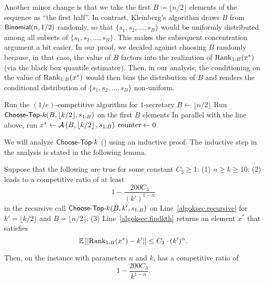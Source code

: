 Another minor change is that we take the first $B \coloneqq \lfloor n/2\rfloor$ elements of the sequence as ``the first half''. In contrast, Kleinberg's algorithm draws $B$ from $\mathsf{Binomial}(n, 1/2)$ randomly, so that $\{s_1, s_2, \ldots, s_B\}$ would be uniformly distributed among all subsets of $\{s_1, s_2, \ldots, s_B\}$. This makes the subsequent concentration argument a bit easier. In our proof, we decided against choosing $B$ randomly because, in that case, the value of $B$ factors into the realization of $\mathrm{Rank}_{1:B}(x^*)$ (via the black box quantile estimator). Then, in our analysis, the conditioning on the value of $\mathrm{Rank}_{1:B}(x^*)$ would then bias the distribution of $B$ and renders the conditional distribution of $\{s_1, s_2, \ldots, s_B\}$ non-uniform.

\begin{algorithm2e}
    \caption{$\choosetopk(n, k, s)$}
    \label{algo:k-secretary}
    {Run the $(1/e)$-competitive algorithm for $1$-secretary}
    $B \leftarrow \lfloor n/2\rfloor$\;
    Run $\textsf{Choose-Top-}k(B, \lfloor k/2\rfloor, s_{1:B})$ on the first $B$ elements\label{algoksec.recursive}\;
    In parallel with the line above, run $x^* \leftarrow \mathcal{A}\left(B, \left\lfloor k/2\right\rfloor, s_{1:B}\right)$\label{algoksec.findkth}\;
    $\mathrm{counter} \gets 0$\;
\end{algorithm2e}

We will analyze $\textsf{Choose-Top-}k$ () using an inductive proof. The inductive step in the analysis is stated in the following lemma.

\begin{lemma}\label{lemma:k-secretary-inductive}
    Suppose that the following are true for some constant $C_3 \ge 1$: (1) $n \ge k \ge 10$; (2)  leads to a competitive ratio of at least 
    \[
        1 - \frac{200C_3}{(k')^{1 - \alpha}}
    \]
    in the recursive call $\textsf{Choose-Top-}k(B, k', s_{1:B})$ on Line~\ref{algoksec.recursive} for $k' = \lfloor k/2 \rfloor$ and $B = \lfloor n/2 \rfloor$; (3) Line~\ref{algoksec.findkth} returns an element $x^*$ that satisfies 
    \[
    \operatorname*{\mathbb{E}}_{}\left[\left|\mathrm{Rank}_{1:B}(x^*) - k'\right|\right] \le C_3\cdot (k')^{\alpha}.
    \]
    Then, on the instance with parameters $n$ and $k$,  has a competitive ratio of
    \[
    1 - \frac{200C_3}{k^{1-\alpha}}.
    \]
\end{lemma}

